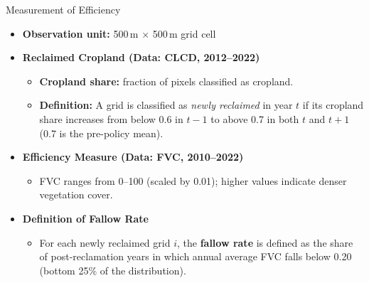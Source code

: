 \documentclass[10pt, xcolor=x11names,compress, aspectratio=169]{beamer}
\begin{document}
\begin{frame}{Measurement of Efficiency}

\begin{itemize}

    \item \textbf{Observation unit:} 500\,m $\times$ 500\,m grid cell

    \vspace{0.9em}
    \item \textbf{Reclaimed Cropland (Data: CLCD, 2012–2022)}
    \begin{itemize}
        \item \textbf{Cropland share:} fraction of pixels classified as cropland.
        \item \textbf{Definition:} A grid is classified as \textit{newly reclaimed} in year $t$ if its cropland share increases from below 0.6 in $t-1$ to above 0.7 in both $t$ and $t+1$ (0.7 is the pre-policy mean).
    \end{itemize}

    \vspace{0.9em}
    \item \textbf{Efficiency Measure (Data: FVC, 2010–2022)}
    \begin{itemize}
        \item FVC ranges from 0–100 (scaled by 0.01); higher values indicate denser vegetation cover.
    \end{itemize}

    \vspace{0.9em}
    \item \textbf{Definition of Fallow Rate}
    \begin{itemize}
        \item For each newly reclaimed grid $i$, the \textbf{fallow rate} is defined as the share of post-reclamation years in which annual average FVC falls below 0.20 (bottom 25\% of the distribution).
    \end{itemize}

\end{itemize}

\end{frame}
\end{document}

